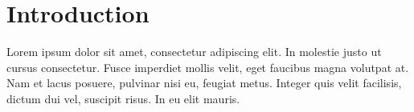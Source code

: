 \documentclass[report.tex]{subfiles}
\begin{document}
\section{Introduction}
Lorem ipsum dolor sit amet, consectetur adipiscing elit. In molestie justo ut cursus consectetur. Fusce imperdiet mollis velit, eget faucibus magna volutpat at. Nam et lacus posuere, pulvinar nisi eu, feugiat metus. Integer quis velit facilisis, dictum dui vel, suscipit risus. In eu elit mauris.
\end{document}
